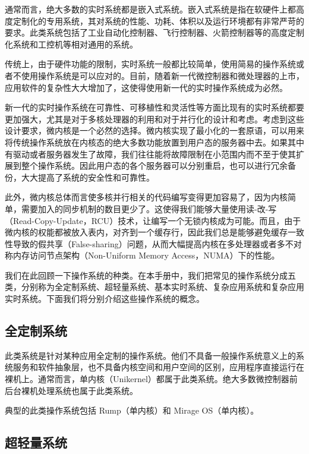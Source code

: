 通常而言，绝大多数的实时系统都是嵌入式系统。嵌入式系统是指在软硬件上都高度定制化的专用系统，其对系统的性能、功耗、体积以及运行环境都有非常严苛的要求。此类系统包括了工业自动化控制器、飞行控制器、火箭控制器等的高度定制化系统和工控机等相对通用的系统。

传统上，由于硬件功能的限制，实时系统一般都比较简单，使用简易的操作系统或者不使用操作系统是可以应对的。目前，随着新一代微控制器和微处理器的上市，应用软件的复杂性大大增加了，这使得使用新一代的实时操作系统成为必然。

新一代的实时操作系统在可靠性、可移植性和灵活性等方面比现有的实时系统都要更加强大，尤其是对于多核处理器的利用和对于并行化的设计和考虑。考虑到这些设计要求，微内核是一个必然的选择。微内核实现了最小化的一套原语，可以用来将传统操作系统放在内核态的绝大多数功能放置到用户态的服务器中去。如果其中有驱动或者服务器发生了故障，我们往往能将故障限制在小范围内而不至于使其扩展到整个操作系统。因此用户态的各个服务器可以分别重启，也可以进行冗余备份，大大提高了系统的安全性和可靠性。

此外，微内核总体而言使多核并行相关的代码编写变得更加容易了，因为内核简单，需要加入的同步机制的数目更少了。这使得我们能够大量使用读-改-写（Read-Copy-Update，RCU）技术，让编写一个无锁内核成为可能。而且，由于微内核的权能都被放入表内，对齐到一个缓存行，因此我们总是能够避免缓存一致性导致的假共享（False-sharing）问题，从而大幅提高内核在多处理器或者多不对称内存访问节点架构（Non-Uniform
Memory Access，NUMA）下的性能。

我们在此回顾一下操作系统的种类。在本手册中，我们把常见的操作系统分成五类，分别称为全定制系统、超轻量系统、基本实时系统、复杂应用系统和复杂应用实时系统。下面我们将分别介绍这些操作系统的概念。

\subsection{全定制系统}\label{subsec:1-fully-customized-systems}

此类系统是针对某种应用全定制的操作系统。他们不具备一般操作系统意义上的系统服务和软件抽象层，也不具备内核空间和用户空间的区别，应用程序直接运行在裸机上。通常而言，单内核（Unikernel）都属于此类系统。绝大多数微控制器前后台裸机处理系统也属于此类系统。

典型的此类操作系统包括 Rump（单内核）和 Mirage OS（单内核）。

\subsection{超轻量系统}\label{subsec:1-ultra-lightweight-systems}

